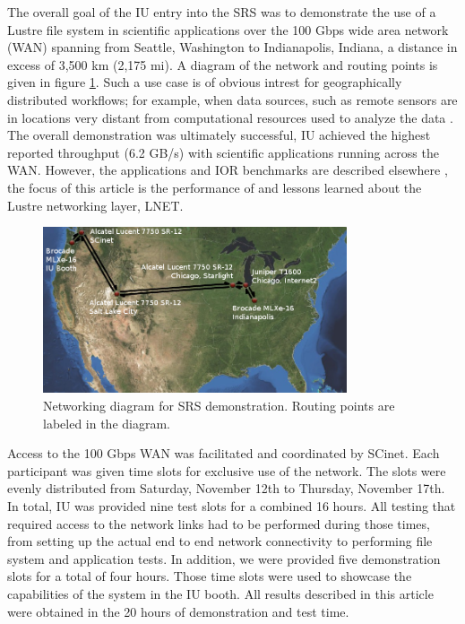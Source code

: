 \documentclass[]{sigplan-proc}
\begin{document}
The overall goal of the IU entry into the SRS was to demonstrate the use of a Lustre file system in scientific
applications over the 100 Gbps wide area network (WAN) spanning from Seattle, Washington to Indianapolis,
Indiana, a distance in excess of 3,500 km (2,175 mi). A diagram of the network and routing points is given in
figure \ref{fig:network}. Such a use case is of obvious intrest for geographically distributed workflows; for
example, when data sources, such as remote sensors are in locations very distant from computational resources
used to analyze the data \cite{henschel2010}. The overall demonstration was ultimately successful, IU
achieved the highest reported throughput (6.2 GB/s) with scientific applications running across the
WAN. However, the applications and IOR benchmarks are described elsewhere \cite{henschel2012}, the
focus of this article is the performance of and lessons learned about the Lustre networking layer, LNET.

\begin{figure}[t]
\begin{center}
\includegraphics[width=0.80\textwidth]{figures/network.png}
\caption{Networking diagram for SRS demonstration. Routing points are labeled in the diagram.}
\label{fig:network}
\end{center}
\end{figure}

Access to the 100 Gbps WAN was facilitated and coordinated by SCinet. Each participant was given time slots
for exclusive use of the network. The slots were evenly distributed from Saturday, November 12th to Thursday,
November 17th. In total, IU was provided nine test slots for a combined 16 hours. All testing that required
access to the network links had to be performed during those times, from setting up the actual end to end
network connectivity to performing file system and application tests. In addition, we were provided five
demonstration slots for a total of four hours. Those time slots were used to showcase the capabilities of the
system in the IU booth. All results described in this article were obtained in the 20 hours of demonstration
and test time.
\end{document}
